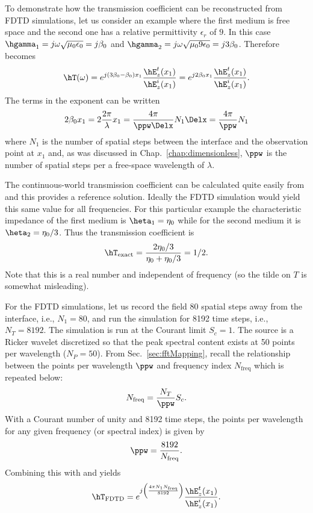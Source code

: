 To demonstrate how the transmission coefficient can be
reconstructed from FDTD simulations, let us consider an example where
the first medium is free space and the second one has a relative
permittivity $\epsilon_r$ of $9$.  In this case
$\hgamma_1=j\omega\sqrt{\mu_0\epsilon_0}=j\beta_0$ and
$\hgamma_2=j\omega\sqrt{\mu_0 9\epsilon_0}=j3\beta_0$.
Therefore  becomes
\begin{equation}
  \hT(\omega) = e^{j(3\beta_0-\beta_0) x_1}
  \frac{\hE_z^t(x_1)}{\hE_z^i(x_1)}
  = e^{j2\beta_0 x_1}
  \frac{\hE_z^t(x_1)}{\hE_z^i(x_1)}.
\end{equation}
The terms in the exponent can be written
\begin{equation}
  2\beta_0 x_1 = 2\frac{2\pi}{\lambda}x_1 = 
  \frac{4\pi}{\ppw\Delx}N_1\Delx =
  \frac{4\pi}{\ppw}N_1
  \label{eq:transExponent}
\end{equation}
where $N_1$ is the number of spatial steps between the interface and
the observation point at $x_1$ and, as was discussed in Chap.\
\ref{chap:dimensionless}, $\ppw$ is the number of spatial steps per a
free-space wavelength of $\lambda$.

The continuous-world transmission coefficient can be calculated quite
easily from \refeq{eq:transCoefSpectral} and this provides a reference
solution.  Ideally the FDTD simulation would yield this same value for
all frequencies.  For this particular example the characteristic
impedance of the first medium is $\heta_1=\eta_0$ while for the second
medium it is $\heta_2=\eta_0/3$.  Thus the transmission coefficient
is
\begin{equation}
  \hT_{\mbox{\scriptsize exact}} = \frac{2\eta_0/3}{\eta_0+\eta_0/3} = 1/2.
  \label{eq:transExact}
\end{equation}
Note that this is a real number and independent of frequency (so the
tilde on $T$ is somewhat misleading).

For the FDTD simulations, let us record the field 80 spatial steps
away from the interface, i.e., $N_1=80$, and run the simulation for
8192 time steps, i.e., $N_T=8192$.  The simulation is run at the
Courant limit $S_c=1$.  The source is a Ricker wavelet discretized so
that the peak spectral content exists at 50 points per wavelength
($N_P=50$).  From Sec.\
\ref{sec:fftMapping}, recall the relationship between the points per
wavelength $\ppw$ and frequency index $N_{\mathrm{freq}}$ which is
repeated below:
\begin{equation}
  N_{\mathrm{freq}} = \frac{N_T}{\ppw} S_c.
\end{equation}
With a Courant number of unity and 8192 time steps, the points per
wavelength for any given frequency (or spectral index) is given by
\begin{equation}
  \ppw = \frac{8192}{N_{\mathrm{freq}}}.
\end{equation}
Combining this with  and
 yields
\begin{equation}
  \hT_{\mbox{\scriptsize FDTD}}
  = e^{j\left(\frac{4\pi N_1N_{\mathrm{freq}}}{8192}\right)}
  \frac{\hE_z^t(x_1)}{\hE_z^i(x_1)}.
  \label{eq:transFDTD}
\end{equation}

